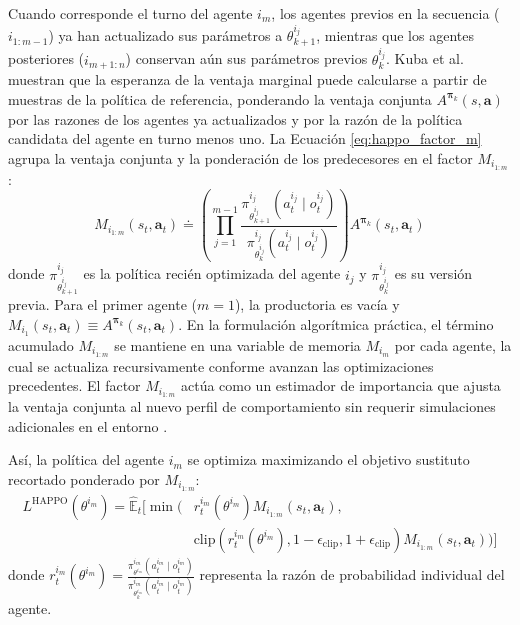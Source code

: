 Cuando corresponde el turno del agente $i_m$, los agentes previos en la secuencia ($i_{1:m-1}$) ya han actualizado sus parámetros a $\theta_{k+1}^{i_j}$, mientras que los agentes posteriores ($i_{m+1:n}$) conservan aún sus parámetros previos $\theta_k^{i_j}$. Kuba et al. \cite{kuba2021trust} muestran que la esperanza de la ventaja marginal puede calcularse a partir de muestras de la política de referencia, ponderando la ventaja conjunta $A^{\boldsymbol{\pi}_k}(s, \mathbf{a})$ por las razones de los agentes ya actualizados y por la razón de la política candidata del agente en turno menos uno. La Ecuación \eqref{eq:happo_factor_m} agrupa la ventaja conjunta y la ponderación de los predecesores en el factor $M_{i_{1:m}}$:
\begin{equation}
    M_{i_{1:m}}(s_t, \mathbf{a}_t) \doteq \left( \prod_{j=1}^{m-1} \frac{\pi_{\theta_{k+1}^{i_j}}^{i_j}(a_t^{i_j} \mid o_t^{i_j})}{\pi_{\theta_k^{i_j}}^{i_j}(a_t^{i_j} \mid o_t^{i_j})} \right) A^{\boldsymbol{\pi}_k}(s_t, \mathbf{a}_t)
    \label{eq:happo_factor_m}
\end{equation}
donde $\pi_{\theta_{k+1}^{i_j}}^{i_j}$ es la política recién optimizada del agente $i_j$ y $\pi_{\theta_k^{i_j}}^{i_j}$ es su versión previa. Para el primer agente ($m=1$), la productoria es vacía y $M_{i_1}(s_t, \mathbf{a}_t) \equiv A^{\boldsymbol{\pi}_k}(s_t, \mathbf{a}_t)$. En la formulación algorítmica práctica, el término acumulado $M_{i_{1:m}}$ se mantiene en una variable de memoria $M_{i_m}$ por cada agente, la cual se actualiza recursivamente conforme avanzan las optimizaciones precedentes. El factor $M_{i_{1:m}}$ actúa como un estimador de importancia que ajusta la ventaja conjunta al nuevo perfil de comportamiento sin requerir simulaciones adicionales en el entorno \cite{kuba2021trust}.

Así, la política del agente $i_m$ se optimiza maximizando el objetivo sustituto recortado ponderado por $M_{i_{1:m}}$:
\begin{equation}
    \begin{aligned}
    L^{\text{HAPPO}}(\theta^{i_m}) = \hat{\mathbb{E}}_t \Big[\min\Big(&
        r_t^{i_m}(\theta^{i_m}) M_{i_{1:m}}(s_t, \mathbf{a}_t), \\
        &\text{clip}\!\left(r_t^{i_m}(\theta^{i_m}),
        1-\epsilon_{\mathrm{clip}},1+\epsilon_{\mathrm{clip}}\right)
        M_{i_{1:m}}(s_t, \mathbf{a}_t)\Big)\Big]
    \end{aligned}
    \label{eq:happo_objetivo_clip}
\end{equation}
donde $r_t^{i_m}(\theta^{i_m}) = \frac{\pi_{\theta^{i_m}}^{i_m}(a_t^{i_m} \mid o_t^{i_m})}{\pi_{\theta_k^{i_m}}^{i_m}(a_t^{i_m} \mid o_t^{i_m})}$ representa la razón de probabilidad individual del agente.

